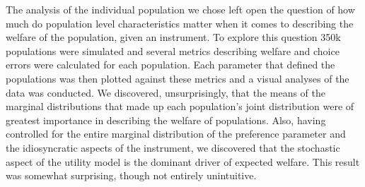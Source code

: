 \documentclass[11pt,a4paper]{article} %
\providecommand{\DIFaddtex}[1]{{\protect\color{blue}\uwave{#1}}} %
\providecommand{\DIFaddbegin}{} %
\providecommand{\DIFaddend}{} %
\providecommand{\DIFdelbegin}{} %
\providecommand{\DIFdelend}{} %
\providecommand{\DIFadd}[1]{\texorpdfstring{\DIFaddtex{#1}}{#1}} %
\newcommand{\DIFscaledelfig}{0.5}
\newlength{\DIFdelgraphicswidth} %
\newlength{\DIFdelgraphicsheight} %
\newcommand{\DIFaddincludegraphics}[2][]{{\color{blue}\fbox{\DIFOincludegraphics[#1]{#2}}}} %
\newcommand{\DIFdelincludegraphics}[2][]{%
\sbox{\DIFdelgraphicsbox}{\DIFOincludegraphics[#1]{#2}}%
\settoboxwidth{\DIFdelgraphicswidth}{\DIFdelgraphicsbox} %
\settoboxtotalheight{\DIFdelgraphicsheight}{\DIFdelgraphicsbox} %
\scalebox{\DIFscaledelfig}{%
\parbox[b]{\DIFdelgraphicswidth}{\usebox{\DIFdelgraphicsbox}\\[-\baselineskip] \rule{\DIFdelgraphicswidth}{0em}}\llap{\resizebox{\DIFdelgraphicswidth}{\DIFdelgraphicsheight}{%
\setlength{\unitlength}{\DIFdelgraphicswidth}%
\begin{picture}(1,1)%
\thicklines\linethickness{2pt} %
{\color[rgb]{1,0,0}\put(0,0){\framebox(1,1){}}}%
{\color[rgb]{1,0,0}\put(0,0){\line( 1,1){1}}}%
{\color[rgb]{1,0,0}\put(0,1){\line(1,-1){1}}}%
\end{picture}%
}\hspace*{3pt}}} %
} %
\DeclareRobustCommand{\DIFaddbegin}{\DIFOaddbegin \let\includegraphics\DIFaddincludegraphics} %
\DeclareRobustCommand{\DIFaddend}{\DIFOaddend \let\includegraphics\DIFOincludegraphics} %
\DeclareRobustCommand{\DIFdelbegin}{\DIFOdelbegin \let\includegraphics\DIFdelincludegraphics} %
\DeclareRobustCommand{\DIFdelend}{\DIFOaddend \let\includegraphics\DIFOincludegraphics} %
\begin{document}
\DIFdelbegin %

\DIFdelend The analysis of the individual population we chose left open the question of how much do population level characteristics matter when it comes to describing the welfare of the population, given an instrument.
To explore this question 350k populations were simulated and several metrics describing welfare and choice errors were calculated for each population.
Each parameter that defined the populations was then plotted against these metrics and a visual analyses of the data was conducted.
We discovered, unsurprisingly, that the means of the marginal distributions that made up each population's joint distribution were of greatest importance in describing the welfare of populations.
Also, having controlled for the entire marginal distribution of the preference parameter and the idiosyncratic aspects of the instrument, we discovered that the stochastic aspect of the utility model is the dominant driver of expected welfare.
This result was somewhat surprising, though not entirely unintuitive.


\DIFaddbegin \subsection{\DIFadd{Concluding Remarks}}
\DIFaddend 
\end{document}

